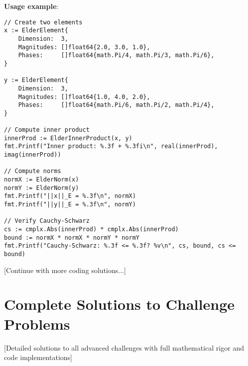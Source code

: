 \textbf{Usage example}:

\begin{lstlisting}[style=golang]
// Create two elements
x := ElderElement{
    Dimension:  3,
    Magnitudes: []float64{2.0, 3.0, 1.0},
    Phases:     []float64{math.Pi/4, math.Pi/3, math.Pi/6},
}

y := ElderElement{
    Dimension:  3,
    Magnitudes: []float64{1.0, 4.0, 2.0},
    Phases:     []float64{math.Pi/6, math.Pi/2, math.Pi/4},
}

// Compute inner product
innerProd := ElderInnerProduct(x, y)
fmt.Printf("Inner product: %.3f + %.3fi\n", real(innerProd), imag(innerProd))

// Compute norms
normX := ElderNorm(x)
normY := ElderNorm(y)
fmt.Printf("||x||_E = %.3f\n", normX)
fmt.Printf("||y||_E = %.3f\n", normY)

// Verify Cauchy-Schwarz
cs := cmplx.Abs(innerProd) * cmplx.Abs(innerProd)
bound := normX * normX * normY * normY
fmt.Printf("Cauchy-Schwarz: %.3f <= %.3f? %v\n", cs, bound, cs <= bound)
\end{lstlisting}

[Continue with more coding solutions...]

\section{Complete Solutions to Challenge Problems}

[Detailed solutions to all advanced challenges with full mathematical rigor and code implementations]



